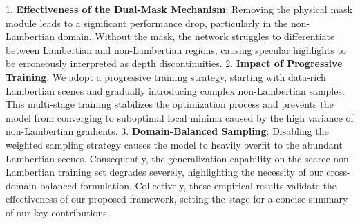 1. \textbf{Effectiveness of the Dual-Mask Mechanism}: Removing the physical mask module leads to a significant performance drop, particularly in the non-Lambertian domain. Without the mask, the network struggles to differentiate between Lambertian and non-Lambertian regions, causing specular highlights to be erroneously interpreted as depth discontinuities.
2. \textbf{Impact of Progressive Training}: We adopt a progressive training strategy, starting with data-rich Lambertian scenes and gradually introducing complex non-Lambertian samples. This multi-stage training stabilizes the optimization process and prevents the model from converging to suboptimal local minima caused by the high variance of non-Lambertian gradients.
3. \textbf{Domain-Balanced Sampling}: Disabling the weighted sampling strategy causes the model to heavily overfit to the abundant Lambertian scenes. Consequently, the generalization capability on the scarce non-Lambertian training set degrades severely, highlighting the necessity of our cross-domain balanced formulation. Collectively, these empirical results validate the effectiveness of our proposed framework, setting the stage for a concise summary of our key contributions.